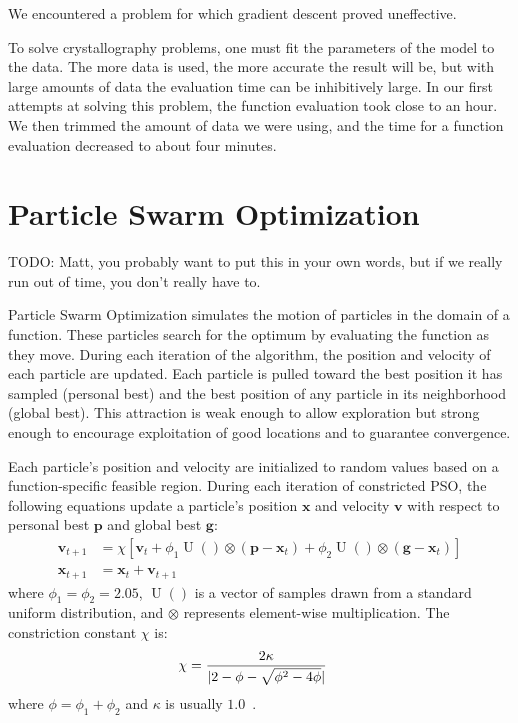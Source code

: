 \documentclass[letterpaper]{sig-alternate}
\renewcommand{\Vec}[1]{\mathbf{#1}}
\DeclareMathOperator{\URand}{U}
\providecommand{\ppos}{\ensuremath{\Vec{x}}}
\providecommand{\pvel}{\ensuremath{\Vec{v}}}
\providecommand{\gbest}{\ensuremath{\Vec{g}}}
\providecommand{\pbest}{\ensuremath{\Vec{p}}}
\providecommand{\constriction}{\ensuremath{\chi}}
\providecommand{\coeff}{\ensuremath{\phi}}
\begin{document}
We encountered a problem for which gradient descent proved uneffective.  

To solve crystallography problems, one must fit the parameters of the model
to the data.  The more data is used, the more accurate the result will be, but
with large amounts of data the evaluation time can be inhibitively large.  In
our first attempts at solving this problem, the function evaluation took close
to an hour.  We then trimmed the amount of data we were using, and the time for
a function evaluation decreased to about four minutes.  




\section{Particle Swarm Optimization}
\label{sec:pso}

TODO: Matt, you probably want to put this in your own words, but if we
really run out of time, you don't really have to.

Particle Swarm Optimization simulates the motion of particles in the domain of
a function.  These particles search for the optimum by evaluating the function
as they move.  During each iteration of the algorithm, the position and
velocity of each particle are updated.  Each particle is pulled toward the
best position it has sampled (personal best) and the best position of any
particle in its neighborhood (global best).  This attraction is weak enough to
allow exploration but strong enough to encourage exploitation of good
locations and to guarantee convergence.

Each particle's position and velocity are initialized to random values based
on a function-specific feasible region.  During each iteration of constricted
PSO, the following equations update a particle's position $\ppos$ and velocity
$\pvel$ with respect to personal best $\pbest$ and global best $\gbest$:
\begin{align}
\label{eq:velupdate}
    \pvel_{t+1} &=
        \constriction \left[ \pvel_t + 
            \coeff_1\URand()\otimes(\pbest - \ppos_{t}) +
            \coeff_2\URand()\otimes(\gbest - \ppos_{t})
        \right] \\
\label{eq:posupdate}
    \ppos_{t+1} &= \ppos_t + \pvel_{t+1}
\end{align}
where $\coeff_1 = \coeff_2 = 2.05$, $\URand()$ is a vector of samples
drawn from a standard uniform distribution, and $\otimes$ represents
element-wise multiplication.  The constriction constant $\constriction$
is:
\begin{align}
    \notag
    \constriction &= \frac{2 \kappa}{|2 - \coeff - \sqrt{\coeff^2 - 4\coeff}|}
\end{align}
where
$\coeff = \coeff_1 + \coeff_2$ and $\kappa$ is usually
$1.0$~\cite{clerc-tec02}.
\end{document}
